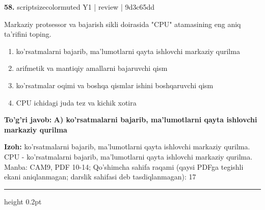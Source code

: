 \documentclass[10pt,a4paper]{article}
\begin{document}
{\bfseries\sffamily\color{ink} 58.} {scriptsizecolor{muted} Y1 | review | 9d3c65dd}
\par
Markaziy protsessor va bajarish sikli doirasida "CPU" atamasining eng aniq ta'rifini toping.
\begin{enumerate}[label=\Alph*),leftmargin=9mm]
\item ko'rsatmalarni bajarib, ma'lumotlarni qayta ishlovchi markaziy qurilma
\item arifmetik va mantiqiy amallarni bajaruvchi qism
\item ko'rsatmalar oqimi va boshqa qismlar ishini boshqaruvchi qism
\item CPU ichidagi juda tez va kichik xotira
\end{enumerate}
\begin{tcolorbox}[enhanced,breakable,colback=teal!4,colframe=teal!60!black,boxrule=0.45pt,arc=1.2mm,left=2.7mm,right=2.7mm,top=1.8mm,bottom=1.8mm,before skip=2mm,after skip=2mm]
{\bfseries\sffamily\color{teal}To'g'ri javob:} \textbf{A) ko'rsatmalarni bajarib, ma'lumotlarni qayta ishlovchi markaziy qurilma}
\par\smallskip
{\bfseries Izoh:} ko'rsatmalarni bajarib, ma'lumotlarni qayta ishlovchi markaziy qurilma. CPU - ko'rsatmalarni bajarib, ma'lumotlarni qayta ishlovchi markaziy qurilma. Manba: CAM9, PDF 10-14; Qo'shimcha sahifa raqami (qaysi PDFga tegishli ekani aniqlanmagan; darslik sahifasi deb tasdiqlanmagan): 17
\end{tcolorbox}
\vspace{2mm}\hrule height 0.2pt\vspace{3mm}
\end{document}

